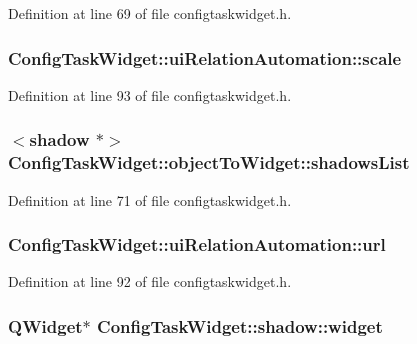 Definition at line 69 of file configtaskwidget.\-h.

\hypertarget{group___u_a_v_object_widget_utils_gafddb00770c074c3ce12d1699813a4d30}{
\subsubsection[{scale}]{ Config\-Task\-Widget\-::ui\-Relation\-Automation\-::scale}}\label{group___u_a_v_object_widget_utils_gafddb00770c074c3ce12d1699813a4d30}


Definition at line 93 of file configtaskwidget.\-h.

\hypertarget{group___u_a_v_object_widget_utils_ga720684f6824db0612bacf1e3769c4ef3}{
\subsubsection[{shadows\-List}]{$<$shadow $\ast$$>$ Config\-Task\-Widget\-::object\-To\-Widget\-::shadows\-List}}\label{group___u_a_v_object_widget_utils_ga720684f6824db0612bacf1e3769c4ef3}


Definition at line 71 of file configtaskwidget.\-h.

\hypertarget{group___u_a_v_object_widget_utils_ga14b83b3a1113a21d03ee1b3e8967b7e7}{
\subsubsection[{url}]{ Config\-Task\-Widget\-::ui\-Relation\-Automation\-::url}}\label{group___u_a_v_object_widget_utils_ga14b83b3a1113a21d03ee1b3e8967b7e7}


Definition at line 92 of file configtaskwidget.\-h.

\hypertarget{group___u_a_v_object_widget_utils_ga06fc48ad3875446139f13fbb5b85cdcf}{
\subsubsection[{widget}]{\setlength{\rightskip}{0pt plus 5cm}Q\-Widget$\ast$ Config\-Task\-Widget\-::shadow\-::widget}}\label{group___u_a_v_object_widget_utils_ga06fc48ad3875446139f13fbb5b85cdcf}


